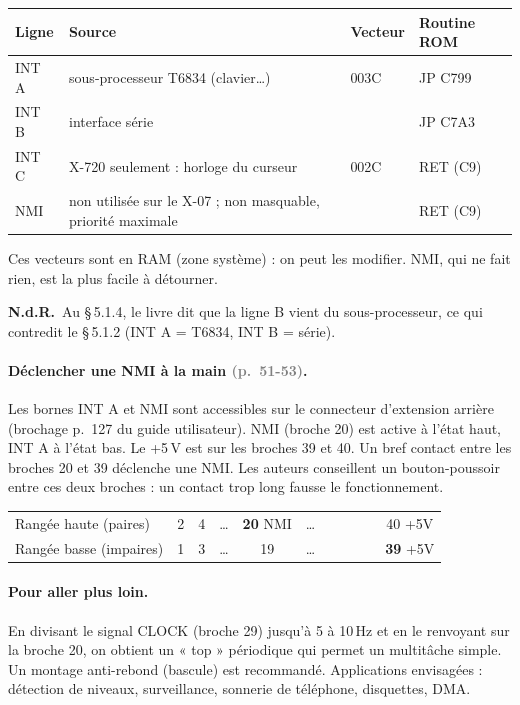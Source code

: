 \documentclass[a4paper,10pt]{article}
\newcommand{\pg}[1]{\texorpdfstring{\textcolor{gray}{\small(p.~#1)}}{}}
\newcommand{\nota}[1]{\textcolor{red!60!black}{\small\textbf{N.d.R.}~#1}}
\begin{document}
\begin{center}\small
\begin{tabular}{@{}l>{\raggedright}p{5.5cm}>{\ttfamily}l>{\ttfamily}l@{}}
\toprule
Ligne & Source & \normalfont Vecteur & \normalfont Routine ROM \\
\midrule
INT A & sous-processeur T6834 (clavier\dots) & 003C & JP C799 \\
INT B & interface série & 0034 & JP C7A3 \\
INT C & X-720 seulement : horloge du curseur & 002C & RET (C9) \\
NMI & non utilisée sur le X-07 ; non masquable, priorité maximale & 0066 & RET (C9) \\
\bottomrule
\end{tabular}
\end{center}
Ces vecteurs sont en RAM (zone système) : on peut les modifier. NMI, qui ne
fait rien, est la plus facile à détourner.

\nota{Au §\,5.1.4, le livre dit que la ligne B vient du sous-processeur, ce
qui contredit le §\,5.1.2 (INT A = T6834, INT B = série).}

\paragraph{Déclencher une NMI à la main \pg{51-53}.} Les bornes INT A et NMI
sont accessibles sur le connecteur d'extension arrière (brochage p.~127 du
guide utilisateur). NMI (broche 20) est active à l'état haut, INT A à l'état
bas. Le +5\,V est sur les broches 39 et 40. Un bref contact entre les
broches 20 et 39 déclenche une NMI. Les auteurs conseillent un bouton-poussoir
entre ces deux broches : un contact trop long fausse le fonctionnement.

\begin{center}\small\ttfamily
\begin{tabular}{@{}l*{10}{c}@{}}
\toprule
\normalfont Rangée haute (paires) & 2 & 4 & \dots & \textbf{20} NMI & \dots & & & & & 40 +5V \\
\normalfont Rangée basse (impaires) & 1 & 3 & \dots & 19 & \dots & & & & & \textbf{39} +5V \\
\bottomrule
\end{tabular}
\end{center}

\paragraph{Pour aller plus loin.} En divisant le signal CLOCK (broche 29)
jusqu'à 5 à 10\,Hz et en le renvoyant sur la broche 20, on obtient un
« top » périodique qui permet un multitâche simple. Un montage anti-rebond
(bascule) est recommandé. Applications envisagées : détection de niveaux,
surveillance, sonnerie de téléphone, disquettes, DMA.
\end{document}
